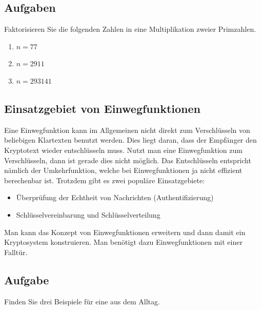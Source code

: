 \subsection{Aufgaben}

Faktorisieren Sie die folgenden Zahlen in eine Multiplikation zweier Primzahlen.

\begin{enumerate}
	\item $n = 77$
	\item $n = 2911$
	\item $n = 293141$
\end{enumerate}

\subsection{Einsatzgebiet von Einwegfunktionen}


Eine Einwegfunktion kann im Allgemeinen nicht direkt zum  Verschlüsseln von beliebigen Klartexten benutzt werden. Dies liegt daran, dass der Empfänger den Kryptotext wieder entschlüsseln muss. Nutzt man eine Einwegfunktion zum Verschlüsseln, dann ist gerade dies nicht möglich. Das Entschlüsseln entspricht nämlich der Umkehrfunktion, welche bei Einwegfunktionen ja nicht effizient berechenbar ist. Trotzdem gibt es zwei populäre Einsatzgebiete:

\begin{itemize}
	\item Überprüfung der Echtheit von Nachrichten (Authentifizierung)
	\item Schlüsselvereinbarung und Schlüsselverteilung
\end{itemize}

Man kann das Konzept von Einwegfunktionen erweitern und dann damit ein Kryptosystem konstruieren. Man benötigt dazu Einwegfunktionen mit einer Falltür.

\subsection{Aufgabe}

Finden Sie drei Beispiele für eine  aus dem Alltag.


